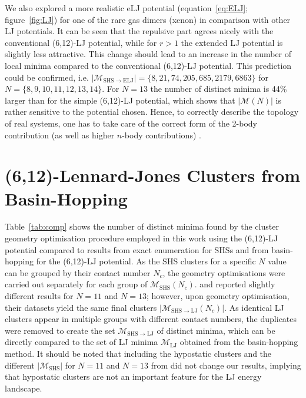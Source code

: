 We also explored a more realistic \ac{eLJ} potential (equation~\eqref{eq:ELJ};
figure~\ref{fig:LJ}) for one of the rare gas dimers (xenon) in comparison with
other \ac{LJ} potentials. It can be seen that the repulsive part agrees nicely
with the conventional (6,12)-\ac{LJ} potential, while for $r > 1$ the extended
\ac{LJ} potential is slightly less attractive. This change should lead to an
increase in the number of local minima compared to the conventional
(6,12)-\ac{LJ} potential. This prediction could be confirmed, i.e.
$|\mathcal{M}_\mathrm{SHS\to ELJ}|=\{8,21,74,205,685,2179,6863\}$ for
$N=\{8,9,10,11,12,13,14\}$. For $N=13$ the number of distinct minima is 44\%
larger than for the simple (6,12)-\ac{LJ} potential, which shows that
$|\mathcal{M}(N)|$ is rather sensitive to the potential chosen. Hence, to
correctly describe the topology of real systems, one has to take care of the
correct form of the 2-body contribution (as well as higher $n$-body
contributions) \autocite{Schwerdtfeger-2016}.


\section{(6,12)-Lennard-Jones Clusters from Basin-Hopping} 
\label{sec:612LennardJonesClustersfromBasinHopping}

Table~\ref{tab:comp} shows the number of distinct minima found by the cluster
geometry optimisation procedure employed in this work using the (6,12)-\ac{LJ}
potential compared to results from exact enumeration for \ac{SHS}s and from
basin-hopping for the (6,12)-\ac{LJ} potential. As the \ac{SHS} clusters for a
specific $N$ value can be grouped by their contact number $N_c$, the geometry
optimisations were carried out separately for each group of
$\mathcal{M}_\mathrm{SHS}(N_c)$.
\citeauthor{Hoy_Structurefinitesphere_2012}
\autocite{Hoy_Structurefinitesphere_2012,Hoy_Structuredynamicsmodel_2015} and
\citeauthor{Holmes-Cerfon_EnumeratingRigidSphere_2016}\autocite{Holmes-Cerfon_EnumeratingRigidSphere_2016}
reported slightly different results for $N=11$ and $N=13$; however, upon
geometry optimisation, their datasets yield the same final clusters
$|\mathcal{M}_{\mathrm{SHS\to LJ}}(N_c)|$. As identical \ac{LJ} clusters appear
in multiple groups with different contact numbers, the duplicates were removed
to create the set $\mathcal{M}_\mathrm{SHS\to LJ}$ of distinct minima, which can
be directly compared to the set of \ac{LJ} minima $\mathcal{M}_\mathrm{LJ}$
obtained from the basin-hopping method. It should be noted that including the
hypostatic clusters and the different $|\mathcal{M}_\mathrm{SHS}|$ for $N=11$
and $N=13$ from
\citeauthor{Holmes-Cerfon_EnumeratingRigidSphere_2016}\autocite{Holmes-Cerfon_EnumeratingRigidSphere_2016}
did not change our results, implying that hypostatic clusters are not an
important feature for the \ac{LJ} energy landscape. 

